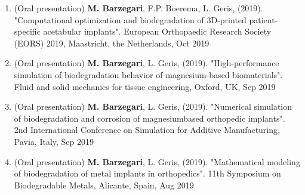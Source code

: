 \documentclass{cv}
\begin{document}
\begin{enumerate}
(Poster presentation) 
\textbf{M. Barzegari}, L. Geris, (2019). "Developing a mathematical model of biodegradable metallic scaffolds for bone tissue engineering applications". 7th Belgian Symposium on Tissue Engineering, Hasselt, Belgium, Nov 2019
\item
(Oral presentation) 
\textbf{M. Barzegari}, F.P. Boerema, L. Geris, (2019). "Computational optimization and biodegradation of 3D-printed patient-specific acetabular implants". European Orthopaedic Research Society (EORS) 2019, Maastricht, the Netherlands, Oct 2019
\item
(Oral presentation) 
\textbf{M. Barzegari}, L. Geris, (2019). "High-performance simulation of biodegradation behavior of magnesium-based biomaterials". Fluid and solid mechanics for tissue engineering, Oxford, UK, Sep 2019
\item
(Oral presentation) 
\textbf{M. Barzegari}, L. Geris, (2019). "Numerical simulation of biodegradation and corrosion of magnesiumbased orthopedic implants". 2nd International Conference on Simulation for Additive Manufacturing, Pavia, Italy, Sep 2019
\item
(Oral presentation) 
\textbf{M. Barzegari}, L. Geris, (2019). "Mathematical modeling of biodegradation of metal implants in orthopedics". 11th Symposium on Biodegradable Metals, Alicante, Spain, Aug 2019
\end{enumerate}
\end{document}
